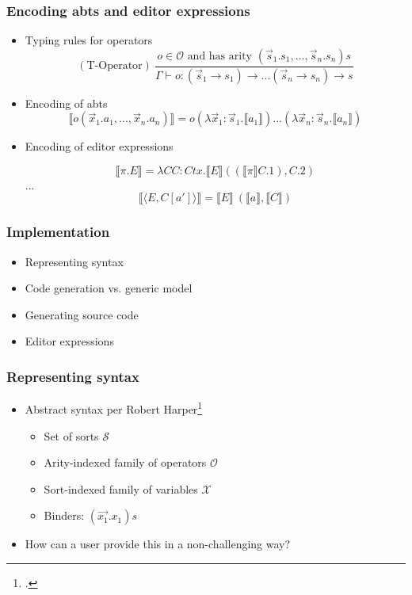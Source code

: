 \documentclass[t,24pt,aspectratio=169]{beamer}
\newcommand{\enc}[1]{\llbracket #1 \rrbracket}
\newcommand{\conf}[2]{\langle #1,#2 \rangle}
\begin{document}
\begin{frame}[hvid]
    \frametitle{Encoding abts and editor expressions}
    \begin{itemize}
        \item Typing rules for operators
              \[
                  (\text{T-Operator}) \ \frac{o \in \mathcal{O} \text{ and has arity } (\Vec{s}_1.s_1,...,\Vec{s}_n.s_n)s}{\Gamma \vdash o : (\Vec{s}_1 \rightarrow s_1) \rightarrow ... (\Vec{s}_n \rightarrow s_n) \rightarrow s}
              \]
        \item Encoding of abts
              \[
                  \llbracket o(\Vec{x}_1.a_1,...,\Vec{x}_n.a_n) \rrbracket = o(\lambda \Vec{x}_1:\Vec{s}_1.\llbracket a_1 \rrbracket)...(\lambda \Vec{x}_n : \Vec{s}_n.\llbracket a_n \rrbracket)
              \]
        \item Encoding of editor expressions
              \begin{center}
                  \[
                      \llbracket \pi.E \rrbracket = \lambda CC : Ctx.\llbracket E \rrbracket ((\llbracket \pi \rrbracket C.1), C.2)
                  \]
                  ...
                  \[
                      \enc{\conf{E}{C[a']}} = \enc{E} \ (\enc{a}, \enc{C})
                  \]
              \end{center}
    \end{itemize}
\end{frame}




\begin{frame}[hvid]
    \frametitle{Implementation}
    \begin{itemize}
        \item Representing syntax
        \item Code generation vs. generic model
        \item Generating source code
        \item Editor expressions
    \end{itemize}
\end{frame}

\begin{frame}[hvid]
    \frametitle{Representing syntax}
    \begin{itemize}
        \item Abstract syntax per Robert Harper\footcite{harper}
              \begin{itemize}
                  \item Set of sorts $\mathcal{S}$
                  \item Arity-indexed family of operators $\mathcal{O}$
                  \item Sort-indexed family of variables $\mathcal{X}$
                  \item Binders: $(\vec{x_1}.x_1)s$
              \end{itemize}
              \pause
        \item How can a user provide this in a non-challenging way?
    \end{itemize}
\end{frame}
\end{document}
